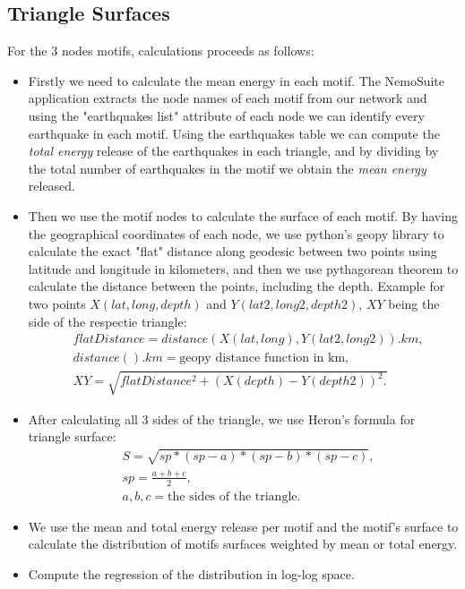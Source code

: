 \clearpage
\subsection{Triangle Surfaces}
For the 3 nodes motifs, calculations proceeds as follows:
\begin{itemize}

	\item Firstly we need to calculate the mean energy in each motif. The NemoSuite application \cite{nemosuite} extracts the node names of each motif from our network and using the "earthquakes list" attribute of each node we can identify every earthquake in each motif. Using the earthquakes table we can compute the {\it total energy} release of the earthquakes in each triangle, and by dividing by the total number of earthquakes in the motif we obtain the {\it mean energy} released.
	
	\item Then we use the motif nodes to calculate the surface of each motif. By having the geographical coordinates of each node, we use python's geopy library to calculate the exact "flat" distance along geodesic between two points using latitude and longitude in kilometers, and then we use pythagorean theorem to calculate the distance between the points, including the depth. Example for two points $X(lat,long,depth)$ and $Y(lat2,long2,depth2)$, $XY$ being the side of the respectie triangle:
	\begin{equation}
	\begin{split}
	&flatDistance = distance(X(lat,long),Y(lat2,long2)).km,\\
	&distance().km = \text{geopy distance function in km},\\
	&XY = \sqrt{flatDistance^2 +(X(depth)-Y(depth2))^2.}
	\end{split}
	\end{equation}
	
	\item After calculating all 3 sides of the triangle, we use Heron's formula for triangle surface:
	\begin{equation}
	\begin{split}
	&S = \sqrt{sp*(sp-a)*(sp-b)*(sp-c)},  \\
	&sp = \frac{a+b+c}{2}, \\
	&a,b,c = \text{the sides of the triangle}.
	\end{split}
	\end{equation}	
	
	\item We use the mean and total energy release per motif and the motif's surface to calculate the distribution of motifs surfaces weighted by mean or total energy.
	
	\item Compute the regression of the distribution in log-log space.
\end{itemize}

